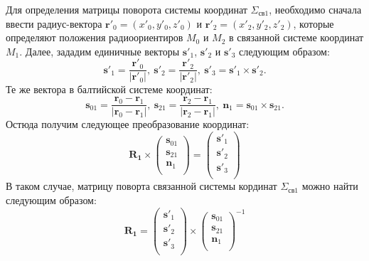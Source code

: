 \documentclass[a4paper,12pt]{article}
\begin{document}
Для определения матрицы поворота системы координат $\Sigma_{\text{св}1}$, необходимо сначала
ввести радиус-вектора $\mathbf{r}'_0 = \left(x'_0, y'_0, z'_0\right)$ и
$\mathbf{r}'_2 = \left(x'_2, y'_2, z'_2\right)$, которые определяют положения радиоориентиров
$M_0$ и $M_2$ в связанной системе координат $M_1$. Далее, зададим единичные векторы
$\mathbf{s}'_1$, $\mathbf{s}'_2$ и $\mathbf{s}'_3$ следующим образом:
\begin{equation}
    \mathbf{s}'_1 = \frac{\mathbf{r}'_0}{|\mathbf{r}'_0|},\
    \mathbf{s}'_2 = \frac{\mathbf{r}'_2}{|\mathbf{r}'_2|},\
    \mathbf{s}'_3 = \mathbf{s}'_1 \times \mathbf{s}'_2.
\end{equation}
Те же вектора в балтийской системе координат:
\begin{equation}
    \mathbf{s}_{01} = \frac{\mathbf{r}_0 - \mathbf{r}_1}{|\mathbf{r}_0 - \mathbf{r}_1|},\
    \mathbf{s}_{21} = \frac{\mathbf{r}_2 - \mathbf{r}_1}{|\mathbf{r}_2 - \mathbf{r}_1|},\
    \mathbf{n}_1 = \mathbf{s}_{01} \times \mathbf{s}_{21}.
\end{equation}
Остюда получим следующее преобразование координат:
\begin{equation}
    \mathbf{R_1} \times
    \left(
    \begin{matrix}
        \mathbf{s}_{01} \\
        \mathbf{s}_{21} \\
        \mathbf{n}_1 \\
    \end{matrix}
    \right) =
    \left(
    \begin{matrix}
        \mathbf{s}'_1 \\
        \mathbf{s}'_2 \\
        \mathbf{s}'_3 \\
    \end{matrix}
    \right)
\end{equation}
В таком случае, матрицу поворта связанной системы кординат $\Sigma_{\text{св}1}$ можно найти следующим образом:
\begin{equation}
    \mathbf{R_1} =
    \left(
    \begin{matrix}
        \mathbf{s}'_1 \\
        \mathbf{s}'_2 \\
        \mathbf{s}'_3 \\
    \end{matrix}
    \right) \times
    \left(
    \begin{matrix}
        \mathbf{s}_{01} \\
        \mathbf{s}_{21} \\
        \mathbf{n}_1 \\
    \end{matrix}
    \right)^{-1}
\end{equation}
\end{document}
